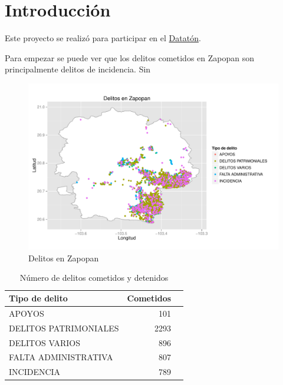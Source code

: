 \newpage
\section{Introducción}





\noindent  Este proyecto se realizó para participar en el \href{http://http://dataton.datos.gob.mx}{Datatón}.

Para empezar se puede ver que los delitos cometidos en Zapopan son principalmente delitos de incidencia. Sin 


\begin{figure}[H]
\centering
\caption{Delitos en Zapopan}
\includegraphics[width=120mm]{../../graphs/zapopan_delitos.pdf}
\end{figure}


\begin{table}[H]
\centering
\caption{Número de delitos cometidos y detenidos} 
\begin{tabular}{lrr}
  \hline
Tipo de delito & Cometidos  \\ 
  \hline
APOYOS & 101  \\ 
  DELITOS PATRIMONIALES & 2293 \\ 
  DELITOS VARIOS & 896 \\ 
  FALTA ADMINISTRATIVA & 807 \\ 
  INCIDENCIA & 789\\ 
   \hline
\end{tabular}
\end{table}


